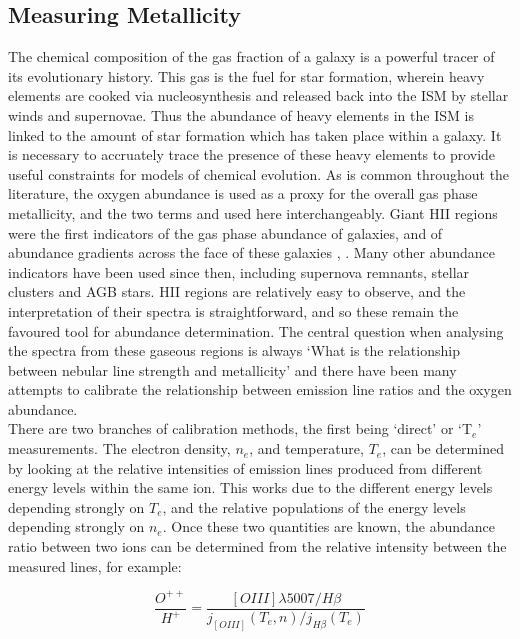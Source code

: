 \documentclass{literature}
\begin{document}
\subsection{Measuring Metallicity}\label{subsec:abundance}
The chemical composition of the gas fraction of a galaxy is a powerful tracer of its evolutionary history. This gas is the fuel for star formation, wherein heavy elements are cooked via nucleosynthesis and released back into the ISM by stellar winds and supernovae. Thus the abundance of heavy elements in the ISM is linked to the amount of star formation which has taken place within a galaxy. It is necessary to accruately trace the presence of these heavy elements to provide useful constraints for models of chemical evolution. As is common throughout the literature, the oxygen abundance is used as a proxy for the overall gas phase metallicity, and the two terms and used here interchangeably. Giant HII regions were the first indicators of the gas phase abundance of galaxies, and of abundance gradients across the face of these galaxies \citep{Searle1971}, \citep{Shields1974}. Many other abundance indicators have been used since then, including supernova remnants, stellar clusters and AGB stars. HII regions are relatively easy to observe, and the interpretation of their spectra is straightforward, and so these remain the favoured tool for abundance determination. The central question when analysing the spectra from these gaseous regions is always `What is the relationship between nebular line strength and metallicity' and there have been many attempts to calibrate the relationship between emission line ratios and the oxygen abundance. \\

There are two branches of calibration methods, the first being `direct' or 	`T$_{e}$' measurements. The electron density, $n_{e}$, and temperature, $T_{e}$, can be determined by looking at the relative intensities of emission lines produced from different energy levels within the same ion. This works due to the different energy levels depending strongly on $T_{e}$, and the relative populations of the energy levels depending strongly on $n_{e}$. Once these two quantities are known, the abundance ratio between two ions can be determined from the relative intensity between the measured lines, for example: 

\begin{equation}
 	\label{eq:ox_abundance}
 	\frac{O^{++}}{H^{+}} = \frac{[OIII]\lambda5007/H\beta}{j_{[OIII]}(T_{e},n)/j_{H\beta}(T_{e})}
 \end{equation} 
\end{document}
